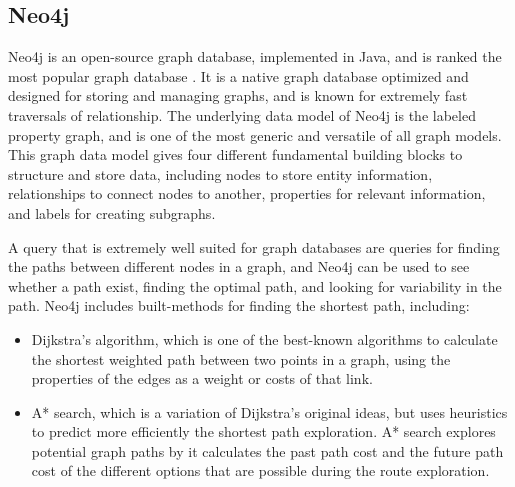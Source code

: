 \subsection{Neo4j}
\label{subsubsec:neo4j}
Neo4j\citep{website:neo4j} is an open-source graph database, implemented in Java, and is ranked the most popular graph database \citep{website:graphdbranking}. It is a native graph database optimized and designed for storing and managing graphs, and is known for extremely fast traversals of relationship. The underlying data model of Neo4j is the labeled property graph, and is one of the most generic and versatile of all graph models\citep[p.73]{robinson13}. This graph data model gives four different fundamental building blocks to structure and store data, including nodes to store entity information, relationships to connect nodes to another, properties for relevant information, and labels for creating subgraphs. 

A query that is extremely well suited for graph databases are queries for finding the paths between different nodes in a graph, and Neo4j can be used to see whether a path exist, finding the optimal path, and looking for variability in the path\citep[p. 51]{bruggen14}. Neo4j includes built-methods for finding the shortest path, including:

\begin{itemize}
\item Dijkstra's algorithm\citep{cormen09}, which is one of the best-known algorithms to calculate the shortest weighted path between two points in a graph, using the properties of the edges as a weight or costs of that link.
\item A* search\citep{russel10}, which is a variation of Dijkstra's original ideas, but uses heuristics to predict more efficiently the shortest path exploration. A* search explores potential graph paths by it calculates the past path cost and the future path cost of the different options that are possible during the route exploration. 
\end{itemize}




